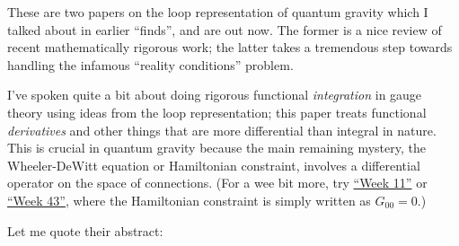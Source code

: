 \documentclass[12pt]{article}
\def\tightlist{}
\renewcommand{\texttt}[1]{%
  \begingroup
  \ttfamily
  \begingroup\lccode`~=`/\lowercase{\endgroup\def~}{/\discretionary{}{}{}}%
  \begingroup\lccode`~=`[\lowercase{\endgroup\def~}{[\discretionary{}{}{}}%
  \begingroup\lccode`~=`.\lowercase{\endgroup\def~}{.\discretionary{}{}{}}%
  \catcode`/=\active\catcode`[=\active\catcode`.=\active
  \scantokens{#1\noexpand}%
  \endgroup
}
\begin{document}

These are two papers on the loop representation of quantum gravity which
I talked about in earlier ``finds'', and are out now. The former is a
nice review of recent mathematically rigorous work; the latter takes a
tremendous step towards handling the infamous ``reality conditions''
problem.

\noindent
I've spoken quite a bit about doing rigorous functional
\emph{integration} in gauge theory using ideas from the loop
representation; this paper treats functional \emph{derivatives} and
other things that are more differential than integral in nature. This is
crucial in quantum gravity because the main remaining mystery, the
Wheeler-DeWitt equation or Hamiltonian constraint, involves a
differential operator on the space of connections. (For a wee bit more,
try \protect\hyperlink{week11}{``Week 11''} or
\protect\hyperlink{week43}{``Week 43''}, where the Hamiltonian
constraint is simply written as \(G_{00} = 0\).)

Let me quote their abstract:
\end{document}

